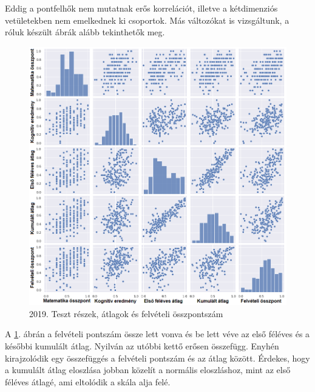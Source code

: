 \documentclass[12pt]{article}
\begin{document}
Eddig a pontfelhők nem mutatnak erős korrelációt, illetve a kétdimenziós vetületekben nem emelkednek ki csoportok. Más változókat is vizsgáltunk, a róluk készült ábrák alább tekinthetők meg.

\begin{figure}[H]
\centering
\includegraphics[width=\textwidth]{kepek/2019minmax4.png}
\caption{2019. Teszt részek, átlagok és felvételi összpontszám}
\label{fig:2019minmax4}
\end{figure}

A \ref{fig:2019minmax4}. ábrán a felvételi pontszám össze lett vonva és be lett véve az első féléves és a későbbi kumulált átlag. Nyilván az utóbbi kettő erősen összefügg. Enyhén kirajzolódik egy összefüggés a felvételi pontszám és az átlag között. Érdekes, hogy a kumulált átlag eloszlása jobban közelít a normális eloszláshoz, mint az első féléves átlagé, ami eltolódik a skála alja felé.
\end{document}
